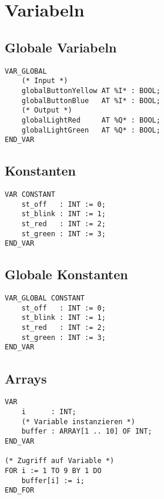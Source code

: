 


\section{Variabeln}

\subsection{Globale Variabeln}
\begin{lstlisting}
VAR_GLOBAL
    (* Input *)
    globalButtonYellow AT %I* : BOOL;
    globalButtonBlue   AT %I* : BOOL;
    (* Output *)
    globalLightRed     AT %Q* : BOOL;
    globalLightGreen   AT %Q* : BOOL;
END_VAR
\end{lstlisting}

\subsection{Konstanten}
\begin{lstlisting}
VAR CONSTANT
    st_off   : INT := 0;
    st_blink : INT := 1;
    st_red   : INT := 2;
    st_green : INT := 3;
END_VAR
\end{lstlisting}

\subsection{Globale Konstanten}
\begin{lstlisting}
VAR_GLOBAL CONSTANT
    st_off   : INT := 0;
    st_blink : INT := 1;
    st_red   : INT := 2;
    st_green : INT := 3;
END_VAR
\end{lstlisting}

\subsection{Arrays}
\begin{lstlisting}
VAR
    i      : INT;
    (* Variable instanzieren *)
    buffer : ARRAY[1 .. 10] OF INT;
END_VAR

(* Zugriff auf Variable *)
FOR i := 1 TO 9 BY 1 DO
    buffer[i] := i;
END_FOR
\end{lstlisting}
